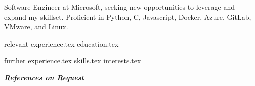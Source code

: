\documentclass[letterpaper,12pt]{article}
\begin{document}
\thispagestyle{empty}

\vspace{0.8cm} 

Software Engineer at Microsoft, seeking new opportunities to leverage and expand my skillset. Proficient in Python, C, Javascript, Docker, Azure, GitLab, VMware, and Linux.


{relevant experience.tex}
{education.tex}


{further experience.tex}
{skills.tex}
{interests.tex}
\thispagestyle{empty}

\vspace*{\fill}
\centering
\textit{\textbf{References on Request}}
\end{document}
